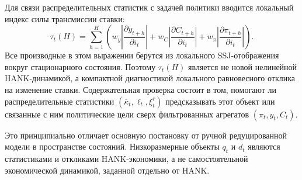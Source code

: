 Для связи распределительных статистик с задачей политики вводится локальный индекс силы
трансмиссии ставки:
\[
\tau_t(H)
=
\sum_{h=1}^{H}
\left(
w_y
\left|
\frac{\partial y_{t+h}}{\partial i_t}
\right|
+
w_C
\left|
\frac{\partial C_{t+h}}{\partial i_t}
\right|
+
w_\pi
\left|
\frac{\partial \pi_{t+h}}{\partial i_t}
\right|
\right).
\]
Все производные в этом выражении берутся из локального SSJ-отображения вокруг стационарного
состояния. Поэтому \(\tau_t(H)\) является не новой нелинейной HANK-динамикой, а компактной
диагностикой локального равновесного отклика на изменение ставки. Содержательная проверка
состоит в том, помогают ли распределительные статистики
\((\overline{\kappa}_t,\ell_t,\xi_t^r)\) предсказывать этот объект или связанные с ним
политические цели сверх фильтрованных агрегатов \((\pi_t,y_t,C_t)\).

Это принципиально отличает основную постановку от ручной редуцированной модели в пространстве состояний. Низкоразмерные объекты \(q_t\) и \(d_t\) являются статистиками и откликами HANK-экономики, а не самостоятельной экономической динамикой, заданной отдельно от HANK.
